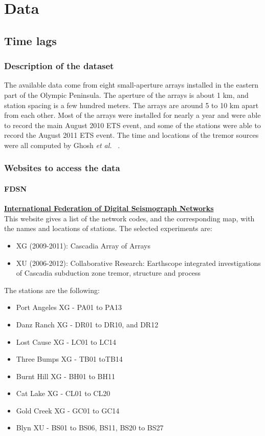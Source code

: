 \documentclass[main.tex]{subfiles}
\begin{document}
\part{Data}

\chapter{Time lags}

\section{Description of the dataset}

The available data come from eight small-aperture arrays installed in the eastern part of the Olympic Peninsula. The aperture of the arrays is about 1 km, and station spacing is a few hundred meters. The arrays are around 5 to 10 km apart from each other. Most of the arrays were installed for nearly a year and were able to record the main August 2010 ETS event, and some of the stations were able to record the August 2011 ETS event. The time and locations of the tremor sources were all computed by Ghosh \textit{et al.} ~\cite{GHO_2012}.

\section{Websites to access the data}

\subsection{FDSN}

\href{http://www.fdsn.org/networks/}{\textbf{International Federation of Digital Seismograph Networks}} \\

This website gives a list of the network codes, and the corresponding map, with the names and locations of stations. The selected experiments are:
\begin{itemize}
	\item XG (2009-2011): Cascadia Array of Arrays
	\item XU (2006-2012): Collaborative Research: Earthscope integrated investigations of Cascadia subduction zone tremor, structure and process
\end{itemize}

The stations are the following:
\begin{itemize}
	\item Port Angeles XG - PA01 to PA13
	\item Danz Ranch XG - DR01 to DR10, and DR12
	\item Lost Cause XG - LC01 to LC14
	\item Three Bumps XG - TB01 toTB14
	\item Burnt Hill XG - BH01 to BH11
	\item Cat Lake XG - CL01 to CL20
	\item Gold Creek XG - GC01 to GC14
	\item Blyn XU - BS01 to BS06, BS11, BS20 to BS27
\end{itemize}
\end{document}
